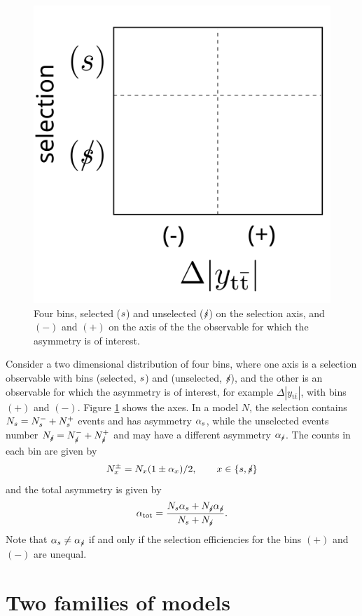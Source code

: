 \documentclass[letterpaper,11pt]{article}
\newcommand{\selected}{{\ensuremath s}}
\newcommand{\unselected}{{\ensuremath\slash\!\!\!\selected}}
\newcommand{\tot}{{\ensuremath\mathrm{tot}}}
\begin{document}
\begin{figure}
  \centering
  \includegraphics[width=0.3\linewidth]{axes}
  \caption{\label{axes} Four bins, selected ($\selected$) and unselected ($\unselected$) on
    the selection axis, and $(-)$ and $(+)$ on the axis of the the
    observable for which the asymmetry is of interest.}
\end{figure}

Consider a two dimensional distribution of four bins, where one axis
is a selection observable with bins (selected, $\selected$) and
(unselected, $\unselected$), and the other is an observable for which
the asymmetry is of interest, for example
$\Delta|y_{\mathrm{t\bar{t}}}|$, with bins $(+)$ and $(-)$.  Figure
\ref{axes} shows the axes. In a model $N$, the selection contains
$N_\selected=N_\selected^-+N_\selected^+$ events and has asymmetry
$\alpha_\selected$, while the unselected events number
$N_\unselected=N_\unselected^-+N_\unselected^+$ and may have a
different asymmetry $\alpha_\unselected$.  The counts in each bin are
given by
\[N_x^{\pm} = N_x(1\pm\alpha_x)/2,\qquad x\in\{\selected,\unselected\}\]
and the total asymmetry is given by
\[\alpha_\tot = \frac{N_\selected\alpha_\selected + N_\unselected\alpha_\unselected}{N_\selected+N_\unselected}.\]
Note that $\alpha_\selected\ne\alpha_\unselected$ if and only if the selection
efficiencies for the bins $(+)$ and $(-)$ are unequal.

\section{Two families of models}
\end{document}
